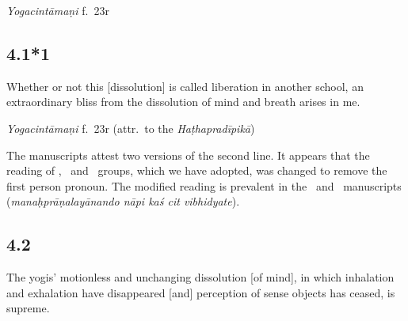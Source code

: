 \begin{ekdosis}
\begin{testimonia}[hp04_001]
\emph{Yogacintāmaṇi} f.~23r
\begin{versinnote}
\end{versinnote}

\end{testimonia}

%

\subsection*{4.1*1}
\begin{translation}[hp04_001_1]
Whether or not this [dissolution] is called liberation in another school, an extraordinary bliss from the dissolution of mind and breath arises in me.
\end{translation}

\begin{testimonia}[hp04_001_1]
\emph{Yogacintāmaṇi} f.~23r (attr.~to the \emph{Haṭhapradīpikā})
\begin{versinnote}
\end{versinnote}
\end{testimonia}

\begin{philcomm}[hp04_001_1]
The manuscripts attest two versions of the second line. It appears that the reading of \textbeta, \textepsilon\ and \texteta\ groups, which we have adopted, was changed to remove the first person pronoun. The modified reading is prevalent in the \textgamma\ and \textdelta\ manuscripts (\emph{manaḥprāṇalayānando nāpi kaś cit vibhidyate}).  
\end{philcomm}
%  

\subsection*{4.2}
\begin{translation}[hp04_002]
The yogis' motionless and unchanging dissolution [of mind], in which inhalation and exhalation have disappeared [and] perception of sense objects has ceased, is supreme.
\end{translation}


\end{ekdosis}
